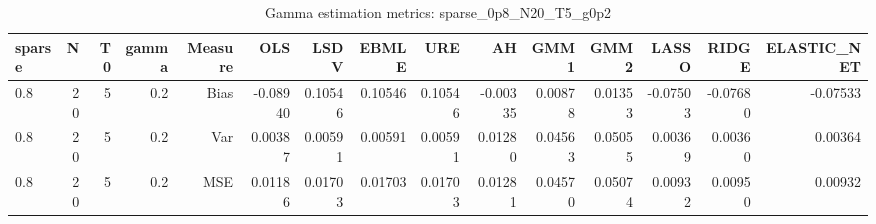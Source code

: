 \begin{table}[!htbp]\centering
\caption{Gamma estimation metrics: sparse_0p8_N20_T5_g0p2}
\label{tab:table1_sparse_0p8_N20_T5_g0p2}
\begin{tabular}{lrrrrrrrrrrrrrr}
\hline
sparse & N & T0 & gamma & Measure & OLS & LSDV & EBMLE & URE & AH & GMM1 & GMM2 & LASSO & RIDGE & ELASTIC_NET \\
\hline
0.8 & 20 & 5 & 0.2 & Bias & -0.08940 & 0.10546 & 0.10546 & 0.10546 & -0.00335 & 0.00878 & 0.01353 & -0.07503 & -0.07680 & -0.07533 \\
0.8 & 20 & 5 & 0.2 & Var & 0.00387 & 0.00591 & 0.00591 & 0.00591 & 0.01280 & 0.04563 & 0.05055 & 0.00369 & 0.00360 & 0.00364 \\
0.8 & 20 & 5 & 0.2 & MSE & 0.01186 & 0.01703 & 0.01703 & 0.01703 & 0.01281 & 0.04570 & 0.05074 & 0.00932 & 0.00950 & 0.00932 \\
\hline
\end{tabular}
\end{table}

